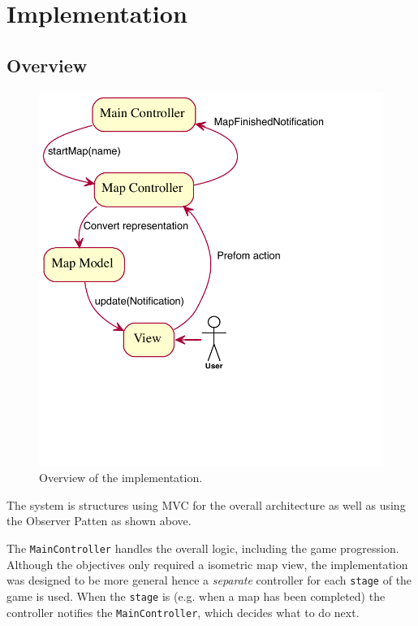 
\section{Implementation}

\subsection{Overview}

\begin{figure}[htbp]
	\centering
		\includegraphics{figures/engine_exported.pdf}
	\caption{Overview of the implementation.}
	\label{fig:overview_engine}
\end{figure}

The system is structures using MVC for the overall architecture as well as  using the Observer Patten as shown above.

The \texttt{MainController} handles the overall logic, including the game progression. 
Although the objectives only required a isometric  map view, the implementation was designed to be more general  hence a \emph{separate} controller for each \texttt{stage} of the game is used. When the \texttt{stage} is  (e.g. when a map has been completed) the controller notifies the \texttt{MainController}, which decides what to do next.   

